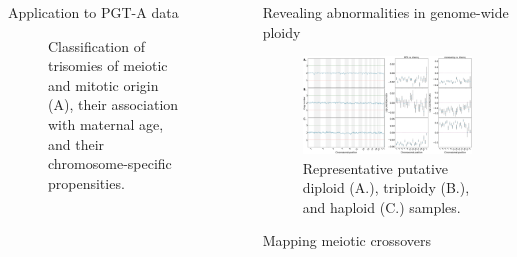 \documentclass[final]{beamer}
\newlength{\sepwidth}
\newlength{\colwidth}
\newcommand{\separatorcolumn}{\begin{column}{\sepwidth}\end{column}}
\begin{document}
\begin{frame}[t]
\begin{columns}[t]
\begin{column}{\colwidth}
\begin{block}{Application to PGT-A data}
\begin{figure}
      \caption{Classification of trisomies of meiotic and mitotic origin (A), their association with maternal age, and their chromosome-specific propensities.}
    \end{figure}
  \end{block}



\end{column}

\separatorcolumn
\begin{column}{\colwidth}


\begin{block}{Revealing abnormalities in genome-wide ploidy}
    
    \begin{figure}
      \centering
     \includegraphics[width=.8\linewidth]{figures/fig7.pdf}

      \caption{Representative putative diploid (A.), triploidy (B.), and haploid (C.) samples.}
    \end{figure}
\end{block}

\begin{block}{Mapping meiotic crossovers}


\end{block}
\end{column}
\end{columns}
\end{frame}
\end{document}
